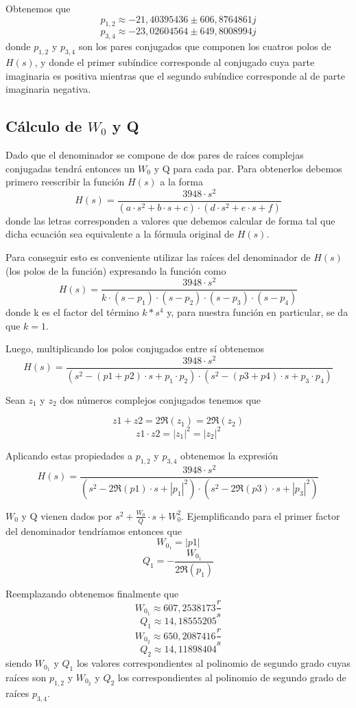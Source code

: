 \documentclass[11pt,a4paper]{report}
\begin{document}
\bigskip
Obtenemos que
\[p_{1,2} \approx -21,40395436 \pm 606,8764861j\]
\[p_{3,4} \approx -23,02604564 \pm 649,8008994j\]
donde $p_{1,2}$ y $p_{3,4}$ son los pares conjugados que componen los cuatros
polos de $H(s)$, y donde el primer subíndice corresponde al conjugado cuya parte imaginaria es positiva mientras que el segundo subíndice corresponde al de parte imaginaria negativa.

\subsection*{Cálculo de $W_{0}$ y Q}
Dado que el denominador se compone de dos pares de raíces complejas conjugadas tendrá entonces un $W_{0}$ y Q para cada par. Para obtenerlos debemos primero reescribir la función $H(s)$ a la forma
\[H(s)=\frac{3948 \cdot s^2}{(a \cdot s^2+b \cdot s+c) \cdot (d \cdot s^2+e \cdot s+f)}\]
donde las letras corresponden a valores que debemos calcular de forma tal que dicha
ecuación sea equivalente a la fórmula original de $H(s)$.

\bigskip
Para conseguir esto es conveniente utilizar las raíces del denominador de $H(s)$ (los polos de la función) expresando la función como
\[H(s)=\frac{3948 \cdot s^2}{k \cdot (s-p_{1}) \cdot (s-p_{2}) \cdot (s-p_{3}) \cdot (s-p_{4})}\]
donde k es el factor del término $k*s^4$ y, para nuestra función en particular,
se da que $k=1$. 

\bigskip
Luego, multiplicando los polos conjugados entre sí obtenemos
\[H(s)=\frac{3948 \cdot s^2}{(s^2-(p1+p2) \cdot s+p_{1} \cdot p_{2}) \cdot (s^2-(p3+p4) \cdot s+p_{3} \cdot p_{4})}\]

\bigskip
Sean $z_{1}$ y $z_{2}$ dos números complejos conjugados tenemos que 

\[z1+z2=2\Re(z_{1}) = 2\Re(z_{2})\] 
\[z1 \cdot z2=|z_{1}|^2=|z_{2}|^2\] 

Aplicando estas propiedades a $p_{1,2}$ y 
$p_{3,4}$ obtenemos la expresión
\[H(s)=\frac{3948 \cdot s^2}{(s^2-2\Re(p1) \cdot s+|p_{1}|^2) \cdot (s^2-2\Re(p3) \cdot s+|p_{3}|^2)}\]

\bigskip
$W_{0}$ y Q vienen dados por $s^2+\frac{W_{0}}{Q} \cdot s + W_{0}^2$. Ejemplificando para el primer factor del denominador tendríamos entonces que 
\[W_{0_{1}} = |p1|\]
\[Q_{1} = -\frac{W_{0_{1}}}{2\Re(p_{1})}\]

\bigskip
Reemplazando obtenemos finalmente que
\[W_{0_{1}} \approx 607,2538173 \frac{r}{s}\]
\[Q_{1} \approx 14,18555205\]
\[W_{0_{2}} \approx 650,2087416 \frac{r}{s}\]
\[Q_{2} \approx 14,11898404\]
siendo $W_{0_{1}}$ y $Q_{1}$ los valores correspondientes al polinomio de segundo 
grado cuyas raíces son $p_{1,2}$ y $W_{0_{2}}$ y $Q_{2}$ los correspondientes
al polinomio de segundo grado de raíces $p_{3,4}$.
\end{document}
